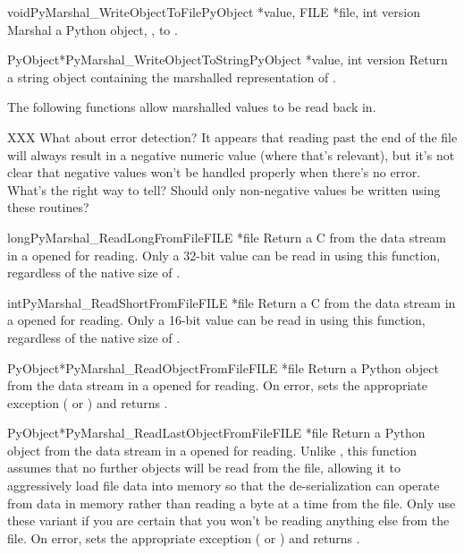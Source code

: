 \begin{cfuncdesc}{void}{PyMarshal_WriteObjectToFile}{PyObject *value,
                                                     FILE *file, int version}
  Marshal a Python object, , to .

\end{cfuncdesc}

\begin{cfuncdesc}{PyObject*}{PyMarshal_WriteObjectToString}{PyObject *value, int version}
  Return a string object containing the marshalled representation of
  .

\end{cfuncdesc}

The following functions allow marshalled values to be read back in.

XXX What about error detection?  It appears that reading past the end
of the file will always result in a negative numeric value (where
that's relevant), but it's not clear that negative values won't be
handled properly when there's no error.  What's the right way to tell?
Should only non-negative values be written using these routines?

\begin{cfuncdesc}{long}{PyMarshal_ReadLongFromFile}{FILE *file}
  Return a C  from the data stream in a 
  opened for reading.  Only a 32-bit value can be read in using
  this function, regardless of the native size of .
\end{cfuncdesc}

\begin{cfuncdesc}{int}{PyMarshal_ReadShortFromFile}{FILE *file}
  Return a C  from the data stream in a 
  opened for reading.  Only a 16-bit value can be read in using
  this function, regardless of the native size of .
\end{cfuncdesc}

\begin{cfuncdesc}{PyObject*}{PyMarshal_ReadObjectFromFile}{FILE *file}
  Return a Python object from the data stream in a 
  opened for reading.  On error, sets the appropriate exception
  ( or ) and returns \NULL.
\end{cfuncdesc}

\begin{cfuncdesc}{PyObject*}{PyMarshal_ReadLastObjectFromFile}{FILE *file}
  Return a Python object from the data stream in a 
  opened for reading.  Unlike
  , this function assumes
  that no further objects will be read from the file, allowing it to
  aggressively load file data into memory so that the de-serialization
  can operate from data in memory rather than reading a byte at a time
  from the file.  Only use these variant if you are certain that you
  won't be reading anything else from the file.  On error, sets the
  appropriate exception ( or
  ) and returns \NULL.
\end{cfuncdesc}


